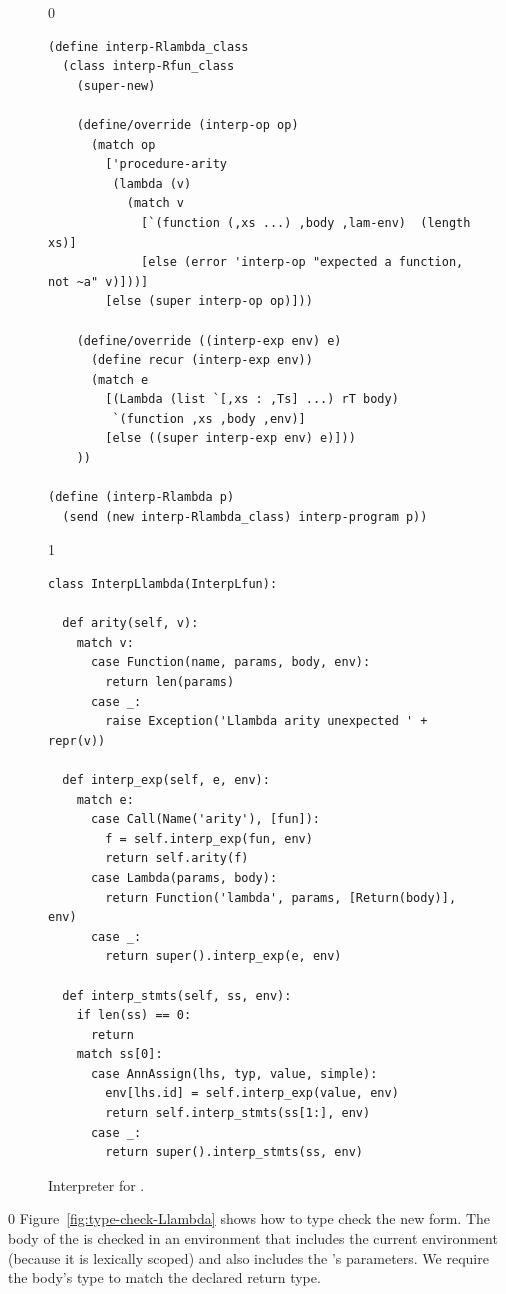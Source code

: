 \documentclass[7x10,nocrop]{TimesAPriori_MIT}%
\def\racketEd{0}
\def\pythonEd{1}
\def\edition{0}
\begin{document}
\begin{figure}[tbp]
{\if\edition\racketEd 
\begin{lstlisting}
(define interp-Rlambda_class
  (class interp-Rfun_class
    (super-new)

    (define/override (interp-op op)
      (match op
        ['procedure-arity
         (lambda (v)
           (match v
             [`(function (,xs ...) ,body ,lam-env)  (length xs)]
             [else (error 'interp-op "expected a function, not ~a" v)]))]
        [else (super interp-op op)]))

    (define/override ((interp-exp env) e)
      (define recur (interp-exp env))
      (match e
        [(Lambda (list `[,xs : ,Ts] ...) rT body)
         `(function ,xs ,body ,env)]
        [else ((super interp-exp env) e)]))
    ))

(define (interp-Rlambda p)
  (send (new interp-Rlambda_class) interp-program p))
\end{lstlisting}
\fi}
{\if\edition\pythonEd
\begin{lstlisting}
class InterpLlambda(InterpLfun):

  def arity(self, v):
    match v:
      case Function(name, params, body, env):
        return len(params)
      case _:
        raise Exception('Llambda arity unexpected ' + repr(v))
      
  def interp_exp(self, e, env):
    match e:
      case Call(Name('arity'), [fun]):
        f = self.interp_exp(fun, env)
        return self.arity(f)
      case Lambda(params, body):
        return Function('lambda', params, [Return(body)], env)
      case _:
        return super().interp_exp(e, env)
    
  def interp_stmts(self, ss, env):
    if len(ss) == 0:
      return
    match ss[0]:
      case AnnAssign(lhs, typ, value, simple):
        env[lhs.id] = self.interp_exp(value, env)
        return self.interp_stmts(ss[1:], env)
      case _:
        return super().interp_stmts(ss, env)
\end{lstlisting}
\fi}
\caption{Interpreter for \LangLam{}.}
\label{fig:interp-Rlambda}
\end{figure}


\label{sec:type-check-r5}

{\if\edition\racketEd
%
Figure~\ref{fig:type-check-Llambda} shows how to type check the new
 form. The body of the  is checked in an
environment that includes the current environment (because it is
lexically scoped) and also includes the 's parameters.  We
require the body's type to match the declared return type.
%
\fi}
\end{document}
